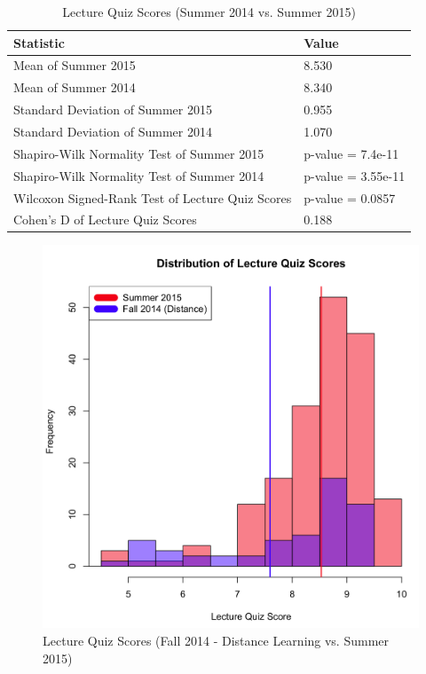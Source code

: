 \pagebreak\clearpage

\begin{small}
\begin{table}
  \centering
  \begin{tabular}{|l|l|}
    \hline
    \textbf{Statistic} & \textbf{Value} \\
	\hline
	Mean of Summer 2015 & 8.530 \\
	\hline
	Mean of Summer 2014 & 8.340 \\
	\hline
	Standard Deviation of Summer 2015 & 0.955 \\
	\hline
	Standard Deviation of Summer 2014 & 1.070 \\
	\hline
	Shapiro-Wilk Normality Test of Summer 2015 & p-value = 7.4e-11 \\
	\hline
	Shapiro-Wilk Normality Test of Summer 2014 & p-value = 3.55e-11 \\
	\hline
	Wilcoxon Signed-Rank Test of Lecture Quiz Scores & p-value = 0.0857 \\
	\hline
	Cohen's D of Lecture Quiz Scores & 0.188 \\
	\hline
  \end{tabular}
	\caption{Lecture Quiz Scores (Summer 2014 vs. Summer 2015)}
  \label{tab:lqSu14Su15}
\end{table}
\end{small}

\pagebreak\clearpage

\begin{figure}
	\centering
	\includegraphics[width=5in]{img/chapter4/lq_su15_vs_f14d}
	\caption{Lecture Quiz Scores (Fall 2014 - Distance Learning vs. Summer 2015)}
  \label{fig:lqf14dSu15}
\end{figure}


